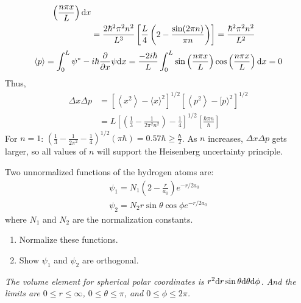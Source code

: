 \begin{solution}
\begin{align*}
        \left(\frac{n \pi x}{L}\right) \mathrm{d} x                                                                        \\
                             & =\frac{2 \hbar^{2} \pi^{2} n^{2}}{L^{3}}\left[\frac{L}{4}\left(2-\frac{\sin (2 \pi n)}
            {\pi n}\right)\right]=\frac{\hbar^{2} \pi^{2} n^{2}}{L^{2}}
    \end{align*}
    \begin{align*}
        \langle p\rangle=\int_{0}^{L} \psi^{*}-i \hbar \frac{\partial}{\partial x} \psi \mathrm{d} x=\frac{-2 i \hbar}{L}
        \int_{0}^{L} \sin \left(\frac{n \pi x}{L}\right)\cos \left(\frac{n \pi x}{L}\right) \mathrm{d} x=0
    \end{align*}
    Thus,
    \begin{align*}
        \Delta x \Delta p & =\left[\left\langle x^{2}\right\rangle-\langle x\rangle^{2}\right]^{1 / 2}\left[\left\langle p^{2}
        \right\rangle-[p\rangle^{2}\right]^{1 / 2}                                                                                                      \\
                          & =L\left[\left(\frac{1}{3}-\frac{1}{2 \pi^{2} n^{2}}\right)-\frac{1}{4}\right]^{1 / 2}\left[\frac{\hbar \pi n}{\hbar}\right]
    \end{align*}
    For $n=1$: $\left(\frac{1}{3}-\frac{1}{2 \pi^{2}}-\frac{1}{4}\right)^{1/2}(\pi\hbar)=0.57\hbar\geq\frac{\hbar}{2}$.
    As $n$ increases, $\Delta x \Delta p$ gets larger, so all values of $n$ will support the Heisenberg uncertainty principle.
\end{solution}

\item Two unnormalized functions of the hydrogen atoms are:
\begin{align*}
    \psi_1=N_1\left(2-\frac{r}{a_0}\right)e^{-r/2a_0} \\
    \psi_2=N_2r\sin\theta\cos\phi e^{-r/2a_0}
\end{align*}
where $N_1$ and $N_2$ are the normalization constants.
\begin{enumerate}
    \item Normalize these functions.
    \item Show $\psi_1$ and $\psi_2$ are orthogonal.
\end{enumerate}

\begin{tcolorbox}
    \textit{The volume element for spherical polar coordinates is $r^2\mathrm{d} r\sin\theta\mathrm{d}\theta\mathrm{d}\phi$. And the limits are
        $0\leq r\leq\infty$, $0\leq\theta\leq\pi$, and $0\leq\phi\leq2\pi$.}
\end{tcolorbox}

